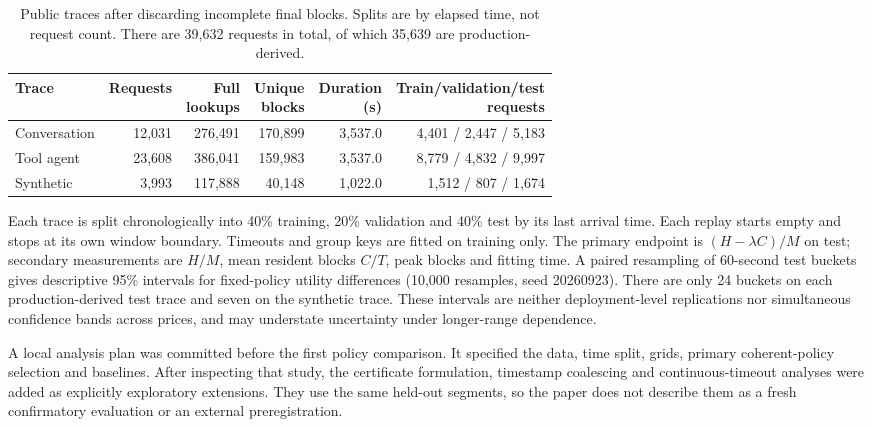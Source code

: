 \documentclass[11pt,a4paper]{article}
\begin{document}
\begin{table}[t]
\centering\small\setlength{\tabcolsep}{5pt}
\begin{tabular}{lrrrrr}
\toprule
Trace & Requests & \shortstack{Full\\lookups} & \shortstack{Unique\\blocks} & \shortstack{Duration\\(s)} & \shortstack{Train/validation/test\\requests}\\
\midrule
Conversation & 12,031 & 276,491 & 170,899 & 3,537.0 & 4,401 / 2,447 / 5,183\\
Tool agent & 23,608 & 386,041 & 159,983 & 3,537.0 & 8,779 / 4,832 / 9,997\\
Synthetic & 3,993 & 117,888 & 40,148 & 1,022.0 & 1,512 / 807 / 1,674\\
\bottomrule
\end{tabular}
\caption{Public traces after discarding incomplete final blocks. Splits are by
elapsed time, not request count. There are 39,632 requests in total, of which
35,639 are production-derived.}\label{tab:data}
\end{table}

Each trace is split chronologically into 40\% training, 20\% validation and 40\%
test by its last arrival time. Each replay starts empty and stops at its own
window boundary. Timeouts and group keys are fitted on training only. The primary
endpoint is $(H-\lambda C)/M$ on test; secondary measurements are $H/M$, mean
resident blocks $C/T$, peak blocks and fitting time. A paired resampling of
60-second test buckets gives descriptive 95\% intervals for fixed-policy utility
differences (10,000 resamples, seed 20260923). There are only 24 buckets on each
production-derived test trace and seven on the synthetic trace. These intervals
are neither deployment-level replications nor simultaneous confidence bands
across prices, and may understate uncertainty under longer-range dependence.

A local analysis plan was committed before the first policy comparison. It
specified the data, time split, grids, primary coherent-policy selection and
baselines. After inspecting that study, the certificate formulation, timestamp
coalescing and continuous-timeout analyses were added as explicitly exploratory
extensions. They use the same held-out segments, so the paper does not describe
them as a fresh confirmatory evaluation or an external preregistration.
\end{document}
